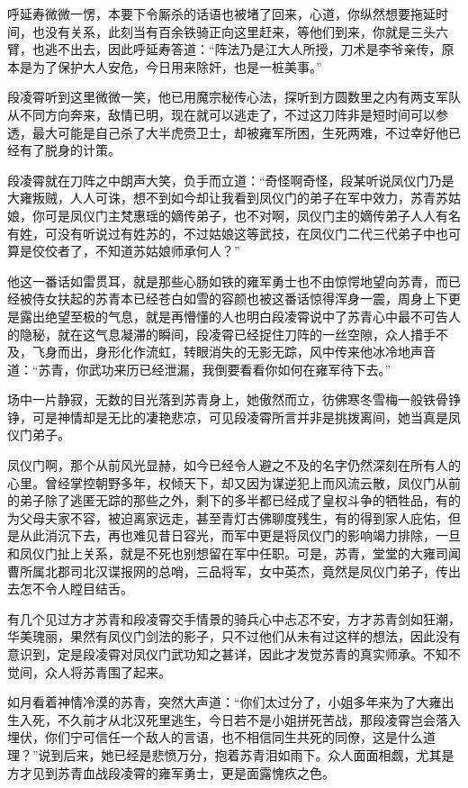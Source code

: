 呼延寿微微一愣，本要下令厮杀的话语也被堵了回来，心道，你纵然想要拖延时间，也没有关系，此刻当有百余铁骑正向这里赶来，等他们到来，你就是三头六臂，也逃不出去，因此呼延寿答道：“阵法乃是江大人所授，刀术是李爷亲传，原本是为了保护大人安危，今日用来除奸，也是一桩美事。”

段凌霄听到这里微微一笑，他已用魔宗秘传心法，探听到方圆数里之内有两支军队从不同方向奔来，敌情已明，现在就可以逃走了，不过这刀阵非是短时间可以参透，最大可能是自己杀了大半虎赍卫士，却被雍军所困，生死两难，不过幸好他已经有了脱身的计策。

段凌霄就在刀阵之中朗声大笑，负手而立道：“奇怪啊奇怪，段某听说凤仪门乃是大雍叛贼，人人可诛，想不到如今却让我看到凤仪门的弟子在军中效力，苏青苏姑娘，你可是凤仪门主梵惠瑶的嫡传弟子，也不对啊，凤仪门主的嫡传弟子人人有名有姓，可没有听说过有姓苏的，不过姑娘这等武技，在凤仪门二代三代弟子中也可算是佼佼者了，不知道苏姑娘师承何人？”

他这一番话如雷贯耳，就是那些心肠如铁的雍军勇士也不由惊愕地望向苏青，而已经被侍女扶起的苏青本已经苍白如雪的容颜也被这番话惊得浑身一震，周身上下更是露出绝望至极的气息，就是再懵懂的人也明白段凌霄说中了苏青心中最不可告人的隐秘，就在这气息凝滞的瞬间，段凌霄已经捉住刀阵的一丝空隙，众人措手不及，飞身而出，身形化作流虹，转眼消失的无影无踪，风中传来他冰冷地声音道：“苏青，你武功来历已经泄漏，我倒要看看你如何在雍军待下去。”

场中一片静寂，无数的目光落到苏青身上，她傲然而立，彷佛寒冬雪梅一般铁骨铮铮，可是神情却是无比的凄艳悲凉，可见段凌霄所言并非是挑拨离间，她当真是凤仪门弟子。

凤仪门啊，那个从前风光显赫，如今已经令人避之不及的名字仍然深刻在所有人的心里。曾经掌控朝野多年，权倾天下，却又因为谋逆犯上而风流云散，凤仪门从前的弟子除了逃匿无踪的那些之外，剩下的多半都已经成了皇权斗争的牺牲品，有的为父母夫家不容，被迫离家远走，甚至青灯古佛聊度残生，有的得到家人庇佑，但是从此消沉下去，再也难见昔日容光，而军中更是将凤仪门的影响竭力排除，一旦和凤仪门扯上关系，就是不死也别想留在军中任职。可是，苏青，堂堂的大雍司闻曹所属北郡司北汉谍报网的总哨，三品将军，女中英杰，竟然是凤仪门弟子，传出去怎不令人瞠目结舌。

有几个见过方才苏青和段凌霄交手情景的骑兵心中忐忑不安，方才苏青剑如狂潮，华美瑰丽，果然有凤仪门剑法的影子，只不过他们从未有过这样的想法，因此没有意识到，定是段凌霄对凤仪门武功知之甚详，因此才发觉苏青的真实师承。不知不觉间，众人将苏青围了起来。

如月看着神情冷漠的苏青，突然大声道：“你们太过分了，小姐多年来为了大雍出生入死，不久前才从北汉死里逃生，今日若不是小姐拼死苦战，那段凌霄岂会落入埋伏，你们宁可信任一个敌人的言语，也不相信同生共死的同僚，这是什么道理？”说到后来，她已经是悲愤万分，抱着苏青泪如雨下。众人面面相觑，尤其是方才见到苏青血战段凌霄的雍军勇士，更是面露愧疚之色。

